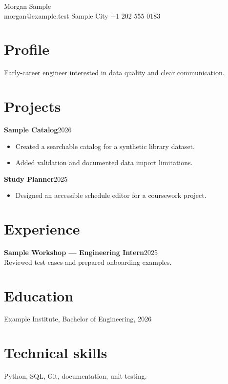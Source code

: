 \documentclass[10pt]{article}
\begin{document}
{\LARGE Morgan Sample}\\
morgan@example.test \quad Sample City \quad +1 202 555 0183
\section*{Profile}
Early-career engineer interested in data quality and clear communication.
\section*{Projects}
\textbf{Sample Catalog}\hfill 2026
\begin{itemize}
\item Created a searchable catalog for a synthetic library dataset.
\item Added validation and documented data import limitations.
\end{itemize}
\textbf{Study Planner}\hfill 2025
\begin{itemize}
\item Designed an accessible schedule editor for a coursework project.
\end{itemize}
\section*{Experience}
\textbf{Sample Workshop --- Engineering Intern}\hfill 2025\\
Reviewed test cases and prepared onboarding examples.
\section*{Education}
Example Institute, Bachelor of Engineering, 2026
\section*{Technical skills}
Python, SQL, Git, documentation, unit testing.
\end{document}
